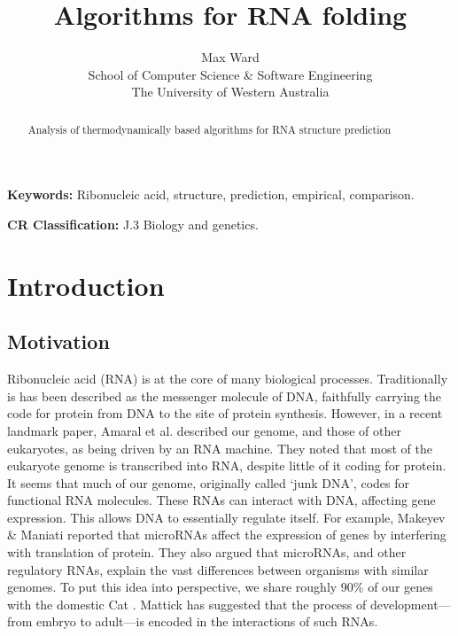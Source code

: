 \documentclass[12pt, a4paper]{article}
\title{Algorithms for RNA folding}
\author{Max Ward \\
School of Computer Science \& Software Engineering \\
The University of Western Australia}
\begin{document}
\maketitle

\begin{abstract}
Analysis of thermodynamically based algorithms for RNA structure prediction
\end{abstract}


{\bf Keywords:} Ribonucleic acid, structure, prediction, empirical, comparison.

{\bf CR Classification:} J.3 Biology and genetics.

\clearpage


\section{Introduction}
\subsection{Motivation}
Ribonucleic acid (RNA) is at the core of many biological processes. Traditionally is has been described as the messenger molecule of DNA, faithfully carrying the code for protein from DNA to the site of protein synthesis. However, in a recent landmark paper, Amaral et al. \cite{amaral2008eukaryotic} described our genome, and those of other eukaryotes, as being driven by an RNA machine. They noted that most of the eukaryote genome is transcribed into RNA, despite little of it coding for protein. It seems that much of our genome, originally called `junk DNA', codes for functional RNA molecules. These RNAs can interact with DNA, affecting gene expression. This allows DNA to essentially regulate itself. For example, Makeyev \& Maniati \cite{makeyev2008multilevel} reported that microRNAs affect the expression of genes by interfering with translation of protein. They also argued that microRNAs, and other regulatory RNAs, explain the vast differences between organisms with similar genomes. To put this idea into perspective, we share roughly 90\% of our genes with the domestic Cat \cite{pontius2007initial}. Mattick \cite{mattick2007new} has suggested that the process of development---from embryo to adult---is encoded in the interactions of such RNAs.
\end{document}
